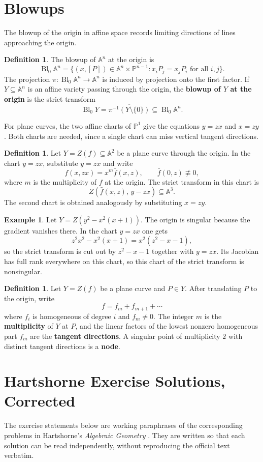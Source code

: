 \documentclass[12pt]{article}
\theoremstyle{plain}
\theoremstyle{definition}
\newtheorem{defn}[thm]{Definition} %
\newtheorem{example}[thm]{Example}
\newcommand{\bb}[1]{\mathbb{#1}}
\begin{document}
\section{Blowups}
The blowup of the origin in affine space records limiting directions of lines approaching the origin.
\begin{defn}\label{def:general_blowup}
The blowup of $\bb A^n$ at the origin is
\[
\operatorname{Bl}_0\bb A^n=\bigl\{(x,[P])\in\bb A^n\times\bb P^{n-1}:x_iP_j=x_jP_i\text{ for all }i,j\bigr\}.
\]
The projection $\pi:\operatorname{Bl}_0\bb A^n\to\bb A^n$ is induced by projection onto the first factor. If $Y\subseteq\bb A^n$ is an affine variety passing through the origin, the \textbf{blowup of $Y$ at the origin} is the strict transform
\[
\operatorname{Bl}_0Y=\overline{\pi^{-1}(Y\setminus\{0\})}\subseteq\operatorname{Bl}_0\bb A^n.
\]
\end{defn}
For plane curves, the two affine charts of $\bb P^1$ give the equations $y=zx$ and $x=zy$. Both charts are needed, since a single chart can miss vertical tangent directions.
\begin{defn}\label{def:plane_curve_blowup}
Let $Y=Z(f)\subseteq\bb A^2$ be a plane curve through the origin. In the chart $y=zx$, substitute $y=zx$ and write
\[
f(x,zx)=x^m\bar f(x,z),\qquad \bar f(0,z)\not\equiv0,
\]
where $m$ is the multiplicity of $f$ at the origin. The strict transform in this chart is
\[
Z(\bar f(x,z),\,y-zx)\subseteq\bb A^3.
\]
The second chart is obtained analogously by substituting $x=zy$.
\end{defn}
\begin{example}\label{ex:node_blowup}
Let $Y=Z(y^2-x^2(x+1))$. The origin is singular because the gradient vanishes there. In the chart $y=zx$ one gets
\[
z^2x^2-x^2(x+1)=x^2(z^2-x-1),
\]
so the strict transform is cut out by $z^2-x-1$ together with $y=zx$. Its Jacobian has full rank everywhere on this chart, so this chart of the strict transform is nonsingular.
\end{example}
\begin{defn}
Let $Y=Z(f)$ be a plane curve and $P\in Y$. After translating $P$ to the origin, write
\[
f=f_m+f_{m+1}+\cdots
\]
where $f_i$ is homogeneous of degree $i$ and $f_m\neq0$. The integer $m$ is the \textbf{multiplicity} of $Y$ at $P$, and the linear factors of the lowest nonzero homogeneous part $f_m$ are the \textbf{tangent directions}. A singular point of multiplicity $2$ with distinct tangent directions is a \textbf{node}.
\end{defn}
\clearpage
\section{Hartshorne Exercise Solutions, Corrected}
\label{sec:hartshorne-solutions}
The exercise statements below are working paraphrases of the corresponding problems in Hartshorne's \emph{Algebraic Geometry} \cite{hartshorne}. They are written so that each solution can be read independently, without reproducing the official text verbatim.
\end{document}
